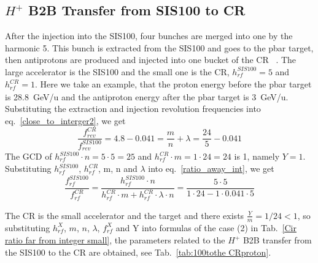 \subsection{$H^{+}$ B2B Transfer from SIS100 to CR} 
After the injection into the SIS100, four bunches are merged into one by the harmonic 5. This bunch is extracted from the SIS100 and goes to the pbar target, then antiprotons are produced and injected into one bucket of the CR ~\cite{steck_demonstration_2011}. The large accelerator is the SIS100 and the small one is the CR, $h^{\mathit{SIS100}}_\mathit{rf}=5$ and $h^{\mathit{CR}}_\mathit{rf}=1$. Here we take an example, that the proton energy before the pbar target is \SI{28.8}{GeV/\atomicmassunit} and the antiproton energy after the pbar target is \SI{3}{GeV/\atomicmassunit}. Substituting the extraction and injection revolution frequencies into eq.~\ref{close_to_interger2}, we get
\begin{equation} 
\frac{f_{\mathit{rev}}^{\mathit{CR}}}{f_{\mathit{rev}}^{\mathit{SIS100}}}=4.8-0.041=\frac{m}{n}+ \lambda=\frac{24}{5}-0.041
\end{equation}
The GCD of $h^{\mathit{SIS100}}_\mathit{rf}\cdot n=5\cdot5=25$ and $h^{\mathit{CR}}_\mathit{rf} \cdot m=1\cdot 24=24$ is 1, namely $Y=1$. Substituting $h^{\mathit{SIS100}}_\mathit{rf}$, $h^{\mathit{CR}}_\mathit{rf}$, m, n and $\lambda$ into eq.~\ref{ratio_away_int}, we get
\begin{equation} 
\frac{f_{\mathit{rf}}^{\mathit{SIS100}}}{f_{\mathit{rf}}^{\mathit{CR}}}=\frac{h^{\mathit{SIS100}}_\mathit{rf}\cdot n}{h^{\mathit{CR}}_\mathit{rf} \cdot m+ h^{\mathit{CR}}_\mathit{rf} \cdot\lambda\cdot n}=\frac{5\cdot 5}{1 \cdot 24- 1 \cdot0.041\cdot 5}
\end{equation}

The CR is the small accelerator and the target and there exists $\frac{Y}{m}=1/24<1$, so substituting $h^X_\mathit{rf}$, $m$, $n$, $\lambda$, $f_{\mathit{rf}}^{X}$ and Y into formulas of the case (2) in Tab.~\ref{Cir ratio far from integer small}, the parameters related to the $H^{+}$ B2B transfer from the SIS100 to the CR are obtained, see Tab.~\ref{tab:100tothe CRproton}.


